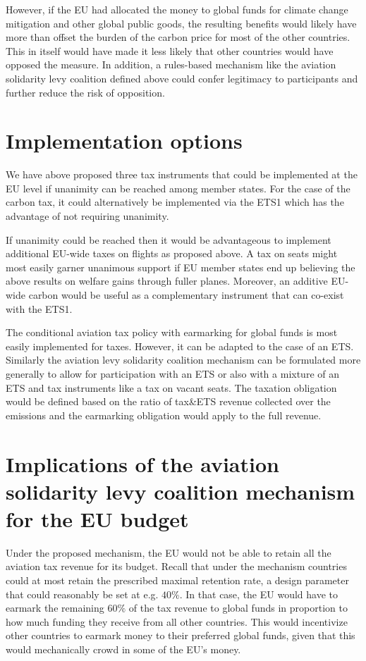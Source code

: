 However, if the EU had allocated the money to global funds for climate change mitigation and other global public goods, the resulting benefits would likely have more than offset the burden of the carbon price for most of the other countries. This in itself would have made it less likely that other countries would have opposed the measure. In addition, a rules-based mechanism like the aviation solidarity levy coalition defined above could confer legitimacy to participants and further reduce the risk of opposition. 

\section{Implementation options}

We have above proposed three tax instruments that could be implemented at the EU level if unanimity can be reached among member states. For the case of the carbon tax, it could alternatively be implemented via the ETS1 which has the advantage of not requiring unanimity.

If unanimity could be reached then it would be advantageous to implement additional EU-wide taxes on flights as proposed above. A tax on seats might most easily garner unanimous support if EU member states end up believing the above results on welfare gains through fuller planes. Moreover, an additive EU-wide carbon would be useful as a complementary instrument that can co-exist with the ETS1.

The conditional aviation tax policy with earmarking for global funds is most easily implemented for taxes. However, it can be adapted to the case of an ETS. Similarly the aviation levy solidarity coalition mechanism can be formulated more generally to allow for participation with an ETS or also with a mixture of an ETS and tax instruments like a tax on vacant seats. The taxation obligation would be defined based on the ratio of tax\&ETS revenue collected over the emissions and the earmarking obligation would apply to the full revenue.%


\section{Implications of the aviation solidarity levy coalition mechanism  for the EU budget}

Under the proposed mechanism, the EU would not be able to retain all the aviation tax revenue for its budget. Recall that under the mechanism countries could at most retain the prescribed maximal retention rate, a design parameter that could reasonably be set at e.g. $40\%$. In that case, the EU would have to earmark the remaining $60\%$ of the tax revenue to global funds in proportion to how much funding they receive from all other countries. This would incentivize other countries to earmark money to their preferred global funds, given that this would mechanically crowd in some of the EU's money.

